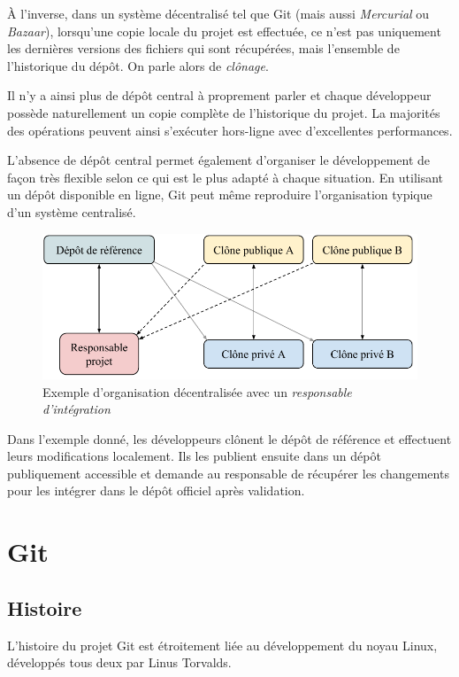 \documentclass[11pt,a4paper]{article}
\begin{document}
À l'inverse, dans un système décentralisé tel que Git (mais aussi \textit{Mercurial} ou \textit{Bazaar}), lorsqu'une copie locale du projet est effectuée, ce n'est pas uniquement les dernières versions des fichiers qui sont récupérées, mais l'ensemble de l'historique du dépôt.
On parle alors de \textit{clônage}.

Il n'y a ainsi plus de dépôt central à proprement parler et chaque développeur possède naturellement un copie complète de l'historique du projet.
La majorités des opérations peuvent ainsi s'exécuter hors-ligne avec d'excellentes performances.

L'absence de dépôt central permet également d'organiser le développement de façon très flexible selon ce qui est le plus adapté à chaque situation.
En utilisant un dépôt disponible en ligne, Git peut même reproduire l'organisation typique d'un système centralisé.

\begin{figure}[ht]
\begin{center}
\includegraphics[width=11.5cm]{img_dvcs}
\caption{Exemple d'organisation décentralisée avec un \textit{responsable d'intégration}}
\end{center}
\end{figure}

Dans l'exemple donné, les développeurs clônent le dépôt de référence et effectuent leurs modifications localement.
Ils les publient ensuite dans un dépôt publiquement accessible et demande au responsable de récupérer les changements pour les intégrer dans le dépôt officiel après validation.

\section{Git}

\subsection{Histoire}

L'histoire du projet Git est étroitement liée au développement du noyau Linux, développés tous deux par Linus Torvalds.
\end{document}
